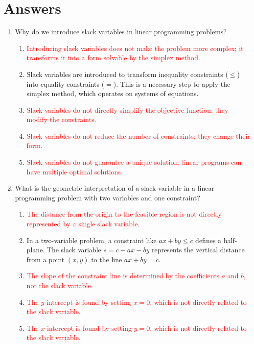 \documentclass{article}%
\newcommand{\incorrect}[1]{\textcolor{red}{#1}}
\begin{document}
\section{Answers}%
\label{sec:Answers}%
\begin{enumerate}%
\item Why do we introduce slack variables in linear programming problems?%
\begin{enumerate}%
\item \incorrect{Introducing slack variables does not make the problem more complex; it transforms it into a form solvable by the simplex method.}%
\item Slack variables are introduced to transform inequality constraints ($≤$) into equality constraints ($=$). This is a necessary step to apply the simplex method, which operates on systems of equations.%
\item \incorrect{Slack variables do not directly simplify the objective function; they modify the constraints.}%
\item \incorrect{Slack variables do not reduce the number of constraints; they change their form.}%
\item \incorrect{Slack variables do not guarantee a unique solution; linear programs can have multiple optimal solutions.}%
\end{enumerate}%
\vspace{1em}%
\item What is the geometric interpretation of a slack variable in a linear programming problem with two variables and one constraint?%
\begin{enumerate}%
\item \incorrect{The distance from the origin to the feasible region is not directly represented by a single slack variable.}%
\item In a two-variable problem, a constraint like $ax + by \le c$ defines a half-plane. The slack variable $s = c - ax - by$ represents the vertical distance from a point $(x, y)$ to the line $ax + by = c$.%
\item \incorrect{The slope of the constraint line is determined by the coefficients $a$ and $b$, not the slack variable.}%
\item \incorrect{The $y$-intercept is found by setting $x = 0$, which is not directly related to the slack variable.}%
\item \incorrect{The $x$-intercept is found by setting $y = 0$, which is not directly related to the slack variable.}%
\end{enumerate}%

\end{enumerate}
\end{document}
